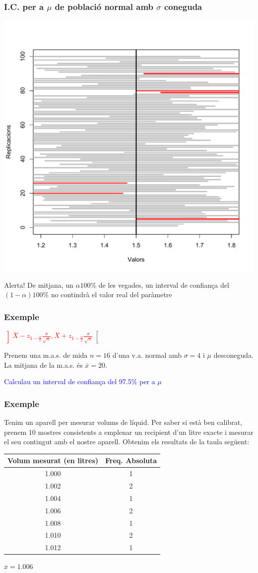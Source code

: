 \documentclass[12pt,t]{beamer}
\newcommand{\red}[1]{\textcolor{red}{#1}}
\newcommand{\blue}[1]{\textcolor{blue}{#1}}
\theoremstyle{plain}
\theoremstyle{definition}
\begin{document}
\begin{frame}
\frametitle{I.C. per a $\mu$ de població normal amb $\sigma$ coneguda}

\begin{center}
\includegraphics[width=0.5\linewidth]{intervals1}
\end{center}

\begin{block}{Alerta!}
De mitjana, un $\alpha100\%$ de les vegades, un interval de confiança del $(1-\alpha)100\%$  no contindrà el valor real del paràmetre
\end{block}

\end{frame}




\begin{frame}
\frametitle{Exemple}
\red{$\displaystyle
\left]\overline{X} -z_{1-\frac{\alpha}{2}} \frac{\sigma}{\sqrt{n}}, \overline{X}+z_{1-\frac{\alpha}{2}}\frac{\sigma}{\sqrt{n}}
\right[$}
\medskip


Prenem una m.a.s. de mida $n=16$ d'una v.a. normal amb $\sigma=4$ i $\mu$ desconeguda. La mitjana de la m.a.s. és 
$\overline{x}=20$.
\medskip

\blue{Calculau un interval de confiança del 97.5\% per a $\mu$}

\end{frame}



\begin{frame}
\frametitle{Exemple}
Tenim un aparell per mesurar volums de líquid. Per saber si està ben
calibrat, prenem 10 mostres consistents a emplenar un recipient d'un litre exacte i mesurar el seu contingut amb el nostre aparell. Obtenim els resultats de la taula següent:
\begin{center}
\begin{tabular}{c|c}
\hline
Volum mesurat  (en litres) & Freq. Absoluta\\
\hline
1.000 & 1 \\
1.002 & 2 \\
1.004 & 1 \\
1.006 & 2 \\
1.008 & 1 \\
1.010 & 2 \\
1.012 & 1 \\
\end{tabular}
\medskip

$\overline{x}=1.006$
\end{center}

\end{frame}
\end{document}
